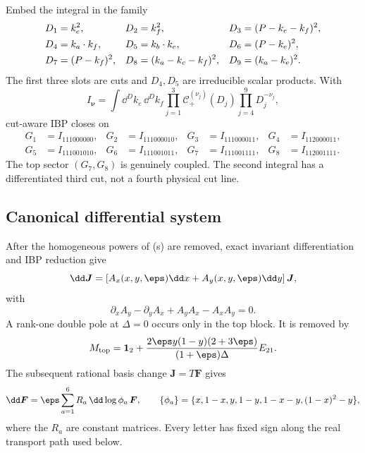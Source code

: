 Embed the integral in the family
\begin{align}
 D_1&=k_e^2,&
 D_2&=k_f^2,&
 D_3&=(P-k_e-k_f)^2,\notag\\
 D_4&=k_a\cdot k_f,&
 D_5&=k_b\cdot k_e,&
 D_6&=(P-k_e)^2,\notag\\
 D_7&=(P-k_f)^2,&
 D_8&=(k_a-k_c-k_f)^2,&
 D_9&=(k_a-k_e)^2.
 \label{eq:nnlo-family-denominators}
\end{align}
The first three slots are cuts and $D_4,D_5$ are irreducible scalar
products.  With
\begin{equation}
 I_{\boldsymbol\nu}
 =\int\dd^Dk_e\,\dd^Dk_f
 \prod_{j=1}^{3}\mathcal C_+^{(\nu_j)}(D_j)
 \prod_{j=4}^{9}D_j^{-\nu_j},
 \label{eq:nnlo-worked-family}
\end{equation}
cut-aware IBP closes on
\begin{equation}
\begin{aligned}
 G_1&=I_{111000000},&
 G_2&=I_{111000010},&
 G_3&=I_{111000011},&
 G_4&=I_{112000011},\\
 G_5&=I_{111001010},&
 G_6&=I_{111001011},&
 G_7&=I_{111001111},&
 G_8&=I_{112001111}.
\end{aligned}
\label{eq:nnlo-eight-master-basis}
\end{equation}
The top sector $(G_7,G_8)$ is genuinely coupled.  The second integral has a
differentiated third cut, not a fourth physical cut line.

\subsection{Canonical differential system}

After the homogeneous powers of (s) are removed, exact invariant
differentiation and IBP reduction give
\begin{equation}
 \dd\boldsymbol J
 =\left[A_x(x,y,\eps)\dd x+A_y(x,y,\eps)\dd y\right]
 \boldsymbol J,
 \label{eq:nnlo-raw-differential-system}
\end{equation}
with
\begin{equation}
 \partial_xA_y-\partial_yA_x+A_yA_x-A_xA_y=0.
 \label{eq:nnlo-flatness}
\end{equation}
A rank-one double pole at $\Delta=0$ occurs only in the top block.  It is
removed by
\begin{equation}
 M_{\rm top}
 =\mathbf1_2+
 \frac{2\eps y(1-y)(2+3\eps)}{(1+\eps)\Delta}E_{21}.
 \label{eq:nnlo-moser-transformation}
\end{equation}
The subsequent rational basis change $\boldsymbol J=T\boldsymbol F$ gives
\begin{equation}
 \dd\boldsymbol F
 =\eps\sum_{a=1}^{6}R_a\,\dd\log\phi_a\,\boldsymbol F,
 \qquad
 \{\phi_a\}=
 \{x,1-x,y,1-y,1-x-y,(1-x)^2-y\},
 \label{eq:nnlo-canonical-system}
\end{equation}
where the $R_a$ are constant matrices.  Every letter has fixed sign along
the real transport path used below.

